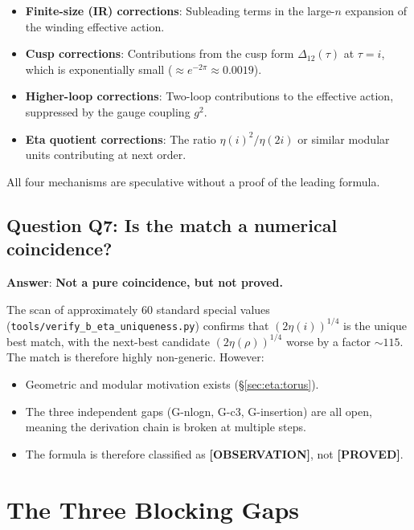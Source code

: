 \documentclass[12pt,a4paper]{article}
\theoremstyle{definition}
\theoremstyle{remark}
\newcommand{\PROVED}{\textcolor{green!60!black}{\textbf{[PROVED]}}}
\newcommand{\OBSERVATION}{\textcolor{violet!80!black}{\textbf{[OBSERVATION]}}}
\begin{document}
\begin{itemize}
  \item \textbf{Finite-size (IR) corrections}: Subleading terms in the
        large-$n$ expansion of the winding effective action.
  \item \textbf{Cusp corrections}: Contributions from the cusp form
        $\Delta_{12}(\tau)$ at $\tau = i$, which is exponentially small
        ($\approx e^{-2\pi} \approx 0.0019$).
  \item \textbf{Higher-loop corrections}: Two-loop contributions to the
        effective action, suppressed by the gauge coupling $g^2$.
  \item \textbf{Eta quotient corrections}: The ratio $\eta(i)^2/\eta(2i)$
        or similar modular units contributing at next order.
\end{itemize}

All four mechanisms are speculative without a proof of the leading formula.

\subsection{Question Q7: Is the match a numerical coincidence?}
\label{sec:q7}

\noindent\textbf{Answer}: \textbf{Not a pure coincidence, but not proved.}

The scan of approximately 60 standard special values
(\texttt{tools/verify\_b\_eta\_uniqueness.py}) confirms that
$(2\eta(i))^{1/4}$ is the unique best match, with the next-best candidate
$(2\eta(\rho))^{1/4}$ worse by a factor $\sim 115$.  The match is
therefore highly non-generic.  However:
\begin{itemize}
  \item Geometric and modular motivation exists (§\ref{sec:eta:torus}).
  \item The three independent gaps (G-nlogn, G-c3, G-insertion) are all
        open, meaning the derivation chain is broken at multiple steps.
  \item The formula is therefore classified as \OBSERVATION, not \PROVED.
\end{itemize}

\section{The Three Blocking Gaps}
\label{sec:eta:gaps}
\end{document}
